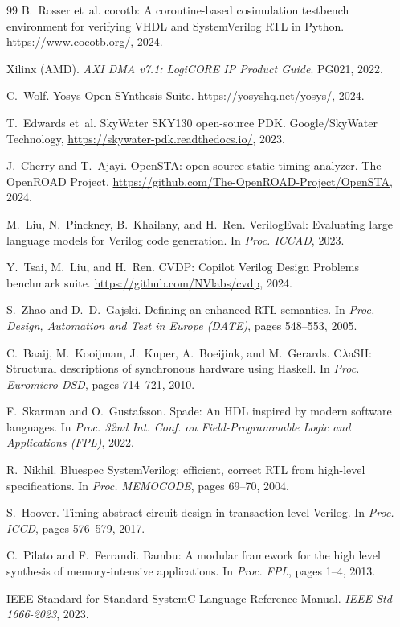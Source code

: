\documentclass[11pt,twocolumn]{article}
\begin{document}
\begin{thebibliography}{99}
B.~Rosser et~al.
cocotb: A coroutine-based cosimulation testbench environment for verifying VHDL and SystemVerilog RTL in Python.
\url{https://www.cocotb.org/}, 2024.

Xilinx (AMD).
\textit{AXI DMA v7.1: LogiCORE IP Product Guide}.
PG021, 2022.

C.~Wolf.
Yosys Open SYnthesis Suite.
\url{https://yosyshq.net/yosys/}, 2024.

T.~Edwards et~al.
SkyWater SKY130 open-source PDK.
Google/SkyWater Technology, \url{https://skywater-pdk.readthedocs.io/}, 2023.

J.~Cherry and T.~Ajayi.
OpenSTA: open-source static timing analyzer.
The OpenROAD Project, \url{https://github.com/The-OpenROAD-Project/OpenSTA}, 2024.

M.~Liu, N.~Pinckney, B.~Khailany, and H.~Ren.
VerilogEval: Evaluating large language models for Verilog code generation.
In \textit{Proc. ICCAD}, 2023.

Y.~Tsai, M.~Liu, and H.~Ren.
CVDP: Copilot Verilog Design Problems benchmark suite.
\url{https://github.com/NVlabs/cvdp}, 2024.

S.~Zhao and D.~D.~Gajski.
Defining an enhanced RTL semantics.
In \textit{Proc. Design, Automation and Test in Europe (DATE)}, pages 548--553, 2005.

C.~Baaij, M.~Kooijman, J.~Kuper, A.~Boeijink, and M.~Gerards.
C$\lambda$aSH: Structural descriptions of synchronous hardware using Haskell.
In \textit{Proc. Euromicro DSD}, pages 714--721, 2010.

F.~Skarman and O.~Gustafsson.
Spade: An HDL inspired by modern software languages.
In \textit{Proc. 32nd Int. Conf. on Field-Programmable Logic and Applications (FPL)}, 2022.

R.~Nikhil.
Bluespec SystemVerilog: efficient, correct RTL from high-level specifications.
In \textit{Proc. MEMOCODE}, pages 69--70, 2004.

S.~Hoover.
Timing-abstract circuit design in transaction-level Verilog.
In \textit{Proc. ICCD}, pages 576--579, 2017.

C.~Pilato and F.~Ferrandi.
Bambu: A modular framework for the high level synthesis of memory-intensive applications.
In \textit{Proc. FPL}, pages 1--4, 2013.

IEEE Standard for Standard SystemC Language Reference Manual.
\textit{IEEE Std 1666-2023}, 2023.


\end{thebibliography}
\end{document}
